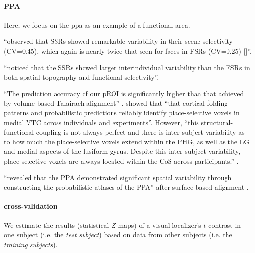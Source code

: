 \paragraph{PPA}
Here, we focus on the \ac{ppa} as an example of a functional area.


%
\citet{zhen2017quantifying} ``observed that SSRs showed remarkable variability
in their scene selectivity (CV=0.45), which again is nearly twice that seen for
faces in FSRs (CV=0.25) [\citet{zhen2015quantifying}]''.

%
\citet{zhen2017quantifying} ``noticed that the SSRs showed larger
interindividual variability than the FSRs in both spatial topography and
functional selectivity''.


``The prediction accuracy of our pROI is significantly higher than
that achieved by volume-based Talairach alignment'' \citep{weiner2018defining}.
%
\citet{weiner2018defining} showed that ``that cortical folding patterns and
probabilistic predictions reliably identify place-selective voxels in medial VTC
across individuals and experiments''.
%
However, ``this structural-functional coupling is not always perfect and there
is inter-subject variability as to how much the place-selective voxels extend
within the PHG, as well as the LG and medial aspects of the fusiform gyrus.
%
Despite this inter-subject variability, place-selective voxels are always
located within the CoS across participants.'' \citep{weiner2018defining}.

%
\citet{frost2012measuring} ``revealed that the PPA demonstrated significant
spatial variability through constructing the probabilistic atlases of the PPA''
after surface-based alignment \citep{zhen2017quantifying}.



\paragraph{cross-validation}



We estimate the results (statistical $Z$-maps) of a visual localizer's
$t$-contrast in one subject (i.e. the \textit{test subject}) based on data from
other subjects (i.e.  the \textit{training subjects}).

